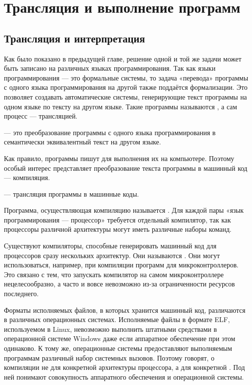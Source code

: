 \chapter{Трансляция и выполнение программ}

\section{Трансляция и интерпретация}

Как было показано в предыдущей главе, решение одной и той же задачи
может быть записано на различных языках программирования. Так как
языки программирования — это формальные системы, то задача «перевода»
программы с одного языка программирования на другой также поддаётся
формализации. Это позволяет создавать автоматические системы,
генерирующие текст программы на одном языке по тексту на другом
языке. Такие программы называются , а
сам процесс — трансляцией.

\begin{defn}
   — это преобразование программы с
  одного языка программирования в семантически эквивалентный текст на
  другом языке.
\end{defn}

Как правило, программы пишут для выполнения их на компьютере. Поэтому
особый интерес представляет преобразование текста программы в машинный
код — компиляция.

\begin{defn}
   — трансляция программы в машинные
  коды.
\end{defn}

Программа, осуществляющая компиляцию называется
.  Для каждой пары «язык
  программирования — процессор» требуется отдельный компилятор, так
как процессоры различной архитектуры могут иметь различные наборы
команд.

Существуют компиляторы, способные генерировать машинный код для
процессоров сразу нескольких архитектур. Они называются
.  Они могут
использоваться, например, при компиляции программ для
микроконтроллеров.  Это связано с тем, что запускать компилятор на
самом микроконтроллере нецелесообразно, а часто и вовсе невозможно
из-за ограниченности ресурсов последнего.

Форматы исполняемых файлов, в которых хранится машинный код,
различаются в различных операционных системах. Исполняемые файлы в
формате ELF, используемом в Linux, невозможно выполнить штатными
средствами в операционной системе Windows даже если аппаратное
обеспечение при этом одинаково. К тому же, операционные системы
предоставляют выполняемым программам различный набор системных
вызовов. Поэтому говорят, о компиляции не для конкретной архитектуры
процессора, а для конкретной
. Под ней понимают совокупность аппаратного обеспечения и
операционной системы.

